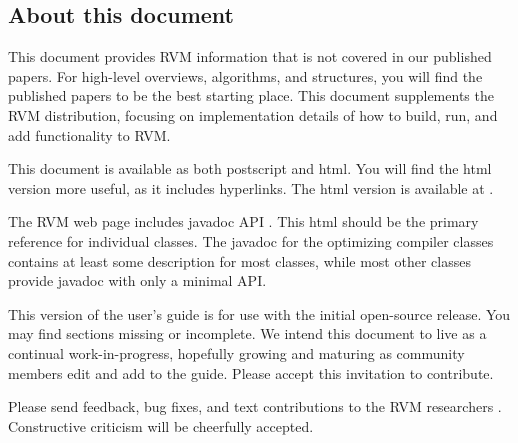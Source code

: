 \subsection {About this document}

This document provides RVM information that is not covered in
our published papers.  For high-level overviews, algorithms, and
structures, you will find the published papers to be the best starting
place. This document supplements
the RVM distribution, focusing on implementation
details of how to build, run, and add functionality to RVM.

This document is available as both postscript and html.  You will find the
html version more useful, as it includes hyperlinks. The html version is
available at 
\xlink{{\tt \RVMUserGuideURL}}{\RVMUserGuideURL}.

The RVM web page includes 
javadoc API 
. 
This html should be the
primary reference for individual classes.  The javadoc for the optimizing
compiler classes contains at least some description for most classes,
while most other classes provide javadoc with only a minimal API.

This version of the user's guide is for use with the initial open-source
release.  You may find sections missing or incomplete. We intend this
document to live as a continual work-in-progress, hopefully growing
and maturing as community members edit and add to the
guide.  Please accept this invitation to contribute.

Please send feedback, bug fixes, and text contributions to the RVM
researchers 
.  
Constructive criticism will be cheerfully 
accepted. 

